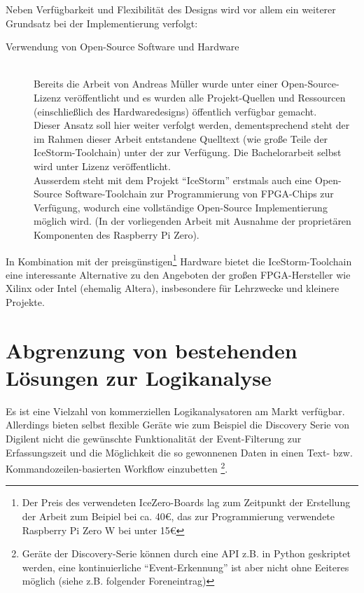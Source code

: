 Neben Verfügbarkeit und Flexibilität des Designs wird vor allem ein weiterer Grundsatz bei der Implementierung verfolgt:
\begin{description}
\item[Verwendung von Open-Source Software und Hardware] \hfill \\
Bereits die Arbeit von Andreas Müller wurde unter einer Open-Source-Lizenz veröffentlicht und es wurden alle Projekt-Quellen und Ressourcen (einschließlich des Hardwaredesigns) öffentlich verfügbar gemacht.\\
Dieser Ansatz soll hier weiter verfolgt werden, dementsprechend steht der im Rahmen dieser Arbeit entstandene Quelltext (wie große Teile der IceStorm-Toolchain) unter der  zur Verfügung. Die Bachelorarbeit selbst wird unter  Lizenz veröffentlicht.\\
Ausserdem steht mit dem Projekt ``IceStorm'' erstmals auch eine Open-Source Software-Toolchain zur Programmierung von FPGA-Chips zur Verfügung, wodurch eine vollständige Open-Source Implementierung möglich wird. (In der vorliegenden Arbeit mit Ausnahme der proprietären Komponenten des Raspberry Pi Zero).
\end{description}
In Kombination mit der preisgünstigen\footnote{Der Preis des verwendeten IceZero-Boards lag zum Zeitpunkt der Erstellung der Arbeit zum Beipiel bei ca. 40€, das zur Programmierung verwendete Raspberry Pi Zero W bei unter 15€} Hardware bietet die IceStorm-Toolchain eine interessante Alternative zu den Angeboten der großen FPGA-Hersteller wie Xilinx oder Intel (ehemalig Altera), insbesondere für Lehrzwecke und kleinere Projekte.

\clearpage 
 
\section{Abgrenzung von bestehenden Lösungen zur Logik\-analyse}

Es ist eine Vielzahl von kommerziellen Logikanalysatoren am Markt verfügbar. Allerdings bieten selbst flexible Geräte wie zum Beispiel die Discovery Serie von Digilent nicht die gewünschte Funktionalität der Event-Filterung zur Erfassungszeit und die Möglichkeit die so gewonnenen Daten in einen Text- bzw. Kommandozeilen-basierten Workflow einzubetten \footnote{Geräte der Discovery-Serie können durch eine \acrshort{API} z.B. in Python geskriptet werden, eine kontinuierliche ``Event-Erkennung'' ist aber nicht ohne Eeiteres möglich (siehe z.B. folgender Foreneintrag\cite{forum:digilent}) }. 

